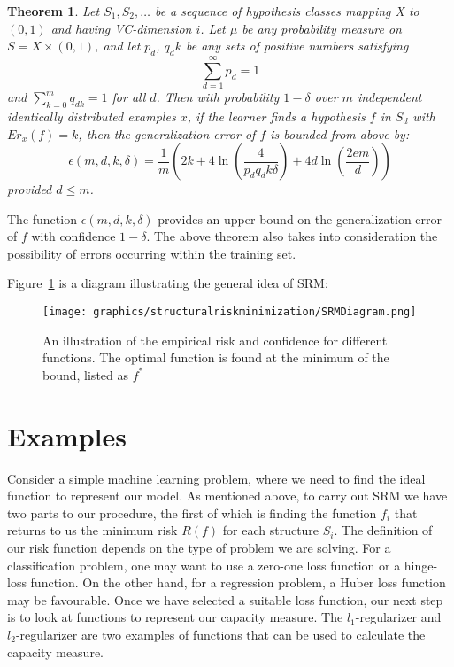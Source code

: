 \newtheorem{srmtheorem}{Theorem}
\begin{srmtheorem} \label{srmthm1}
Let $S_{1},S_{2},\ldots$ be a sequence of hypothesis classes mapping {X} to $\left(0,1\right)$ and having VC-dimension $i$. Let $\mu$ be any probability measure on $S=X\times\left(0,1\right)$, and let $p_d$, $q_dk$ be any sets of positive numbers satisfying 
\begin{equation}\label{srmthm}
\displaystyle \sum_{d=1}^{\infty} p_{d} = 1
\end{equation}
and $\sum_{k=0}^{m} q_{dk} = 1$ for all $d$. Then with probability $1-\delta$ over $m$ independent identically distributed examples $x$, if the learner finds a hypothesis $f$ in $S_d$ with $Er_{x}(f)=k$, then the generalization error of $f$ is bounded from above by:
\begin{equation}\label{srmthm}
\epsilon(m,d,k,\delta)=\frac{1}{m}\left(2k+4\ln\left(\frac{4}{{p_d}{q_dk}{\delta}}\right)+4d\ln\left(\frac{2em}{d}\right)\right)
\end{equation}
provided $d \leq m$.
\end{srmtheorem}

The function $\epsilon(m,d,k,\delta)$ provides an upper bound on the generalization error of $f$ with confidence $1-\delta$. The above theorem also takes into consideration the possibility of errors occurring within the training set. 

Figure~\ref{fig:srm} is a diagram illustrating the general idea of SRM:

\begin{figure}[h]
\centering
\texttt{[image: graphics/structuralriskminimization/SRMDiagram.png]}
\caption{An illustration of the empirical risk and confidence for different functions. The optimal function is found at the minimum of the bound, listed as $f^{*}$}
\label{fig:srm}
\end{figure}

\section{Examples}\label{sec:examples}


Consider a simple machine learning problem, where we need to find the ideal function to represent our model. As mentioned above, to carry out SRM we have two parts to our procedure, the first of which is finding the function $f_{i}$ that returns to us the minimum risk $R(f)$ for each structure $S_{i}$. The definition of our risk function depends on the type of problem we are solving. For a classification problem, one may want to use a zero-one loss function or a hinge-loss function. On the other hand, for a regression problem, a Huber loss function may be favourable. Once we have selected a suitable loss function, our next step is to look at functions to represent our capacity measure. The $l_{1}$-regularizer and $l_{2}$-regularizer are two examples of functions that can be used to calculate the capacity measure. 


